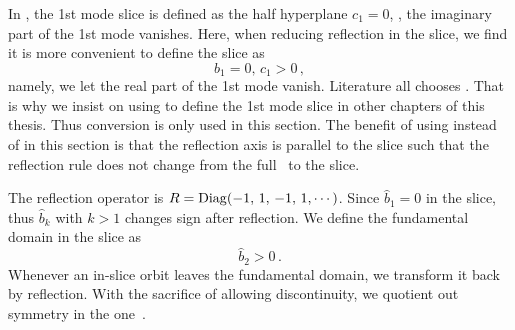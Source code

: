 In , the 1st mode slice 
is defined as the half hyperplane $c_1=0$, \ie, the imaginary
part of the 1st mode vanishes. Here, when reducing reflection in the slice,
we find it is more convenient to define the slice as
\begin{equation}
  \label{eq:ksslice2}
  b_1 = 0,\, c_1 > 0 \,,
\end{equation}
namely, we let the real part of the 1st mode vanish.
Literature all chooses .
That is why we insist on using  to define the 1st mode
slice in other chapters of this thesis.
Thus conversion 
is only used in this section. The benefit of using 
instead of  in this section
is that the reflection axis is parallel
to the slice  such that the reflection rule does
not change from the full \statesp\ to the slice.

The reflection operator is $R=\operatorname{Diag}(-1,\, 1, \, -1, \, 1,\cdots)$.
Since $\hat{b}_1 =0$ in the slice, thus $\hat{b}_k$ with $k>1$ changes sign
after reflection. We define the fundamental domain in the slice as
\begin{equation}
  \label{eq:fundDomain}
  \hat{b}_2 > 0
  \,.
\end{equation}
Whenever an in-slice orbit leaves the fundamental domain, we transform
it back by reflection. With the sacrifice of allowing discontinuity,
we quotient out \On{2} symmetry in the one\dmn\ \KSe.

